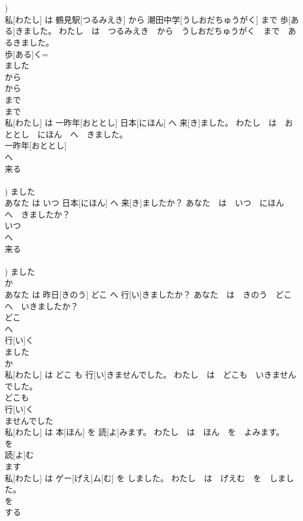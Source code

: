 \documentclass[8pt]{extreport}
\begin{document}
\begin{CJK}{UTF8}{min}
\\	[くる] 
\\	[き])			
\\	私[わたし] は 鶴見駅[つるみえき] から 潮田中学[うしおだちゅうがく] まで 歩[ある]きました。	わたし　は　つるみえき　から　うしおだちゅうがく　まで　あるきました。	
\\	歩[ある]く= 
\\	ました 
\\	から 
\\	から 
\\	まで 
\\	まで 
\\	私[わたし] は 一昨年[おととし] 日本[にほん] へ 来[き]ました。	わたし　は　おととし　にほん　へ　きました。	
\\	一昨年[おととし] 
\\	へ 
\\	来る 
\\	[くる] 
\\	[き])	ました 
\\	あなた は いつ 日本[にほん] へ 来[き]ましたか？	あなた　は　いつ　にほん　へ　きましたか？	
\\	いつ 
\\	へ 
\\	来る 
\\	[くる] 
\\	[き])	ました 
\\	か 
\\	あなた は 昨日[きのう] どこ へ 行[い]きましたか？	あなた　は　きのう　どこ　へ　いきましたか？	
\\	どこ 
\\	へ 
\\	行[い]く 
\\	ました 
\\	か 
\\	私[わたし] は どこ も 行[い]きませんでした。	わたし　は　どこも　いきませんでした。	
\\	どこも 
\\	行[い]く 
\\	ませんでした 
\\	私[わたし] は 本[ほん] を 読[よ]みます。	わたし　は　ほん　を　よみます。	
\\	を 
\\	読[よ]む 
\\	ます 
\\	私[わたし] は ゲー[げえ]ム[む] を しました。	わたし　は　げえむ　を　しました。	
\\	を 
\\	する 

\end{CJK}
\end{document}
